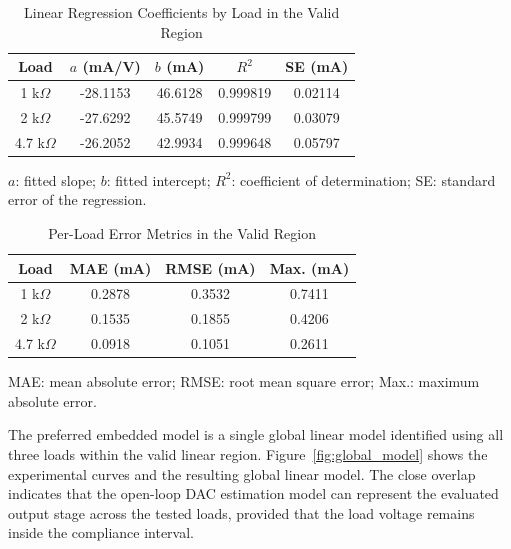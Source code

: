 \documentclass[conference]{IEEEtran}
\begin{document}
\begin{table}[!htbp]
\caption{Linear Regression Coefficients by Load in the Valid Region}
\begin{center}
\scriptsize
\renewcommand{\arraystretch}{0.92}
\begin{tabular}{|c|c|c|c|c|}
\hline
\textbf{Load} & \textbf{$a$ (mA/V)} & \textbf{$b$ (mA)} & \textbf{$R^2$} & \textbf{SE (mA)} \\
\hline
1 k$\Omega$ & -28.1153 & 46.6128 & 0.999819 & 0.02114 \\
\hline
2 k$\Omega$ & -27.6292 & 45.5749 & 0.999799 & 0.03079 \\
\hline
4.7 k$\Omega$ & -26.2052 & 42.9934 & 0.999648 & 0.05797 \\
\hline
\end{tabular}
\renewcommand{\arraystretch}{1}
\vspace{1mm}

\parbox{\columnwidth}{\scriptsize $a$: fitted slope; $b$: fitted intercept; $R^2$: coefficient of determination; SE: standard error of the regression.}
\label{tab:load_regression}
\end{center}
\end{table}

\begin{table}[!htbp]
\caption{Per-Load Error Metrics in the Valid Region}
\begin{center}
\scriptsize
\renewcommand{\arraystretch}{0.92}
\begin{tabular}{|c|c|c|c|}
\hline
\textbf{Load} & \textbf{MAE (mA)} & \textbf{RMSE (mA)} & \textbf{Max. (mA)} \\
\hline
1 k$\Omega$ & 0.2878 & 0.3532 & 0.7411 \\
\hline
2 k$\Omega$ & 0.1535 & 0.1855 & 0.4206 \\
\hline
4.7 k$\Omega$ & 0.0918 & 0.1051 & 0.2611 \\
\hline
\end{tabular}
\renewcommand{\arraystretch}{1}
\vspace{1mm}

\parbox{\columnwidth}{\scriptsize MAE: mean absolute error; RMSE: root mean square error; Max.: maximum absolute error.}
\label{tab:load_error_metrics}
\end{center}
\end{table}

The preferred embedded model is a single global linear model identified using all three loads within the valid linear region. Figure~\ref{fig:global_model} shows the experimental curves and the resulting global linear model. The close overlap indicates that the open-loop DAC estimation model can represent the evaluated output stage across the tested loads, provided that the load voltage remains inside the compliance interval.
\end{document}
